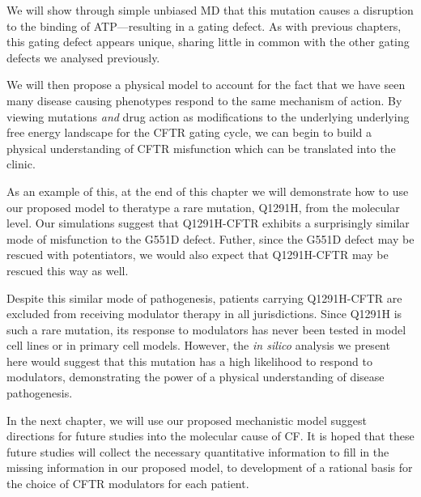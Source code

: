 We will show through simple unbiased MD that this mutation causes a disruption to the binding of ATP---resulting in a gating defect. As with previous chapters, this gating defect appears unique, sharing little in common with the other gating defects we analysed previously. 

We will then propose a physical model to account for the fact that we have seen many disease causing phenotypes respond to the same mechanism of action. By viewing mutations \textit{and} drug action as modifications to the underlying underlying free energy landscape for the CFTR gating cycle, we can begin to build a physical understanding of CFTR misfunction which can be translated into the clinic. 

As an example of this, at the end of this chapter we will demonstrate how to use our proposed model to theratype a rare mutation, Q1291H, from the molecular level. Our simulations suggest that Q1291H-CFTR exhibits a surprisingly similar mode of misfunction to the G551D defect. Futher, since the G551D defect may be rescued with potentiators, we would also expect that Q1291H-CFTR may be rescued this way as well. 

Despite this similar mode of pathogenesis, patients carrying Q1291H-CFTR are excluded from receiving modulator therapy in all jurisdictions. Since Q1291H is such a rare mutation, its response to modulators has never been tested in model cell lines or in primary cell models. However, the \textit{in silico} analysis we present here would suggest that this mutation has a high likelihood to respond to modulators, demonstrating the power of a physical understanding of disease pathogenesis.

In the next chapter, we will use our proposed mechanistic model suggest directions for future studies into the molecular cause of CF. It is hoped that these future studies will collect the necessary quantitative information to fill in the missing information in our proposed model, to development of a rational basis for the choice of CFTR modulators for each patient. 



